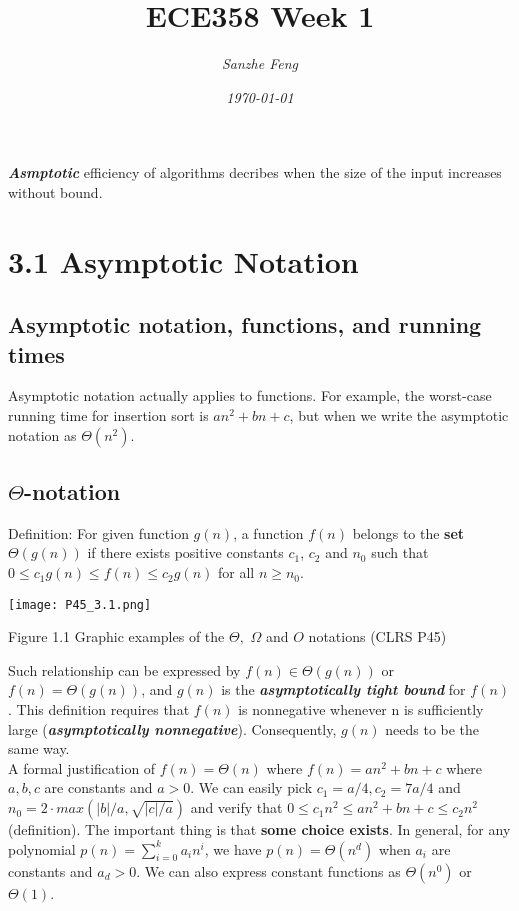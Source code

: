 \documentclass{article}
\begin{document}
\begin{titlepage}
	

\title{\textbf{ECE358 Week 1}}
\author{\textit{Sanzhe Feng}}
\date{\textit{\today}}
\maketitle
\end{titlepage}
\setlength{\parindent}{0pt}

\textbf{\emph{Asmptotic}} efficiency of algorithms decribes when the size of the input increases without bound.

\section*{3.1 Asymptotic Notation}

\subsection*{Asymptotic notation, functions, and running times}
Asymptotic notation actually applies to functions. For example, the worst-case running time for insertion sort is $an^2+bn+c$, but when we write the asymptotic notation as $\Theta(n^2)$.
\subsection*{$\Theta$-notation}
Definition: For given function $g(n)$, a function $f(n)$ belongs to the \textbf{set} $\Theta(g(n))$ if there exists positive constants $c_1$, $c_2$ and $n_0$ such that $0 \leq c_1g(n)\leq f(n)\leq c_2g(n)$ for all $n \geq n_0$.

\texttt{[image: P45\_3.1.png]}
\begin{center}
\small{Figure 1.1 Graphic examples of the $\Theta,$ $\Omega$ and $O$ notations (CLRS P45)}	
\end{center}

Such relationship can be expressed by $f(n) \in \Theta(g(n))$ or $f(n) = \Theta(g(n))$, and $g(n)$ is the \textbf{\textit{asymptotically tight bound}} for $f(n)$. This definition requires that $f(n)$ is nonnegative whenever n is sufficiently large (\emph{\textbf{asymptotically nonnegative}}). Consequently, $g(n)$ needs to be the same way. \\


A formal justification of  $f(n) = \Theta (n)$ where $f(n) = an^2+bn+c$ where $a,b,c$ are constants and $a > 0$. We can easily pick $c_1 = a/4, c_2 = 7a/4$ and $n_0 = 2 \cdot max(|b|/a, \sqrt{|c|/a})$ and verify that 
$0 \leq c_1n^2\leq an^2+bn+c\leq c_2n^2$ (definition). The important thing is that \textbf{some choice exists}. In general, for any polynomial $p(n)=\sum_{i=0}^{k}a_in^i$, we have $p(n) =\Theta(n^d)$ when $a_i$ are constants and $a_d>0$. We can also express constant functions as $\Theta(n^0)$ or $\Theta(1)$.
\end{document}
